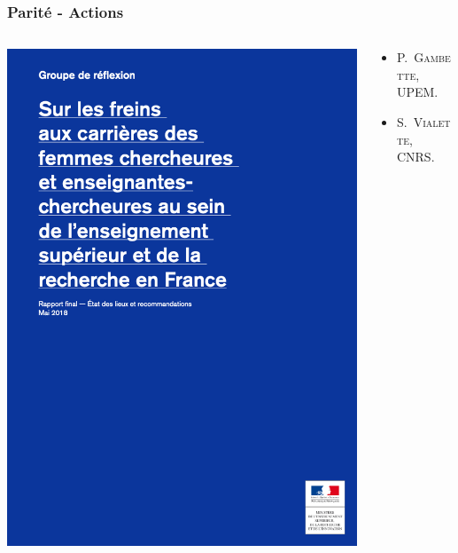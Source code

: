 \documentclass[]{beamer}
\begin{document}

\begin{frame}
  \frametitle{Parité - Actions}

  \begin{center}
    \begin{columns}
      \begin{column}{0.5\textwidth}
        \includegraphics[scale=.375]{pictures/MESRI}
      \end{column}
      \begin{column}{0.5\textwidth}
        \begin{itemize}
          \item \textsc{P.~Gambette}, UPEM.
          \item \textsc{S.~Vialette}, CNRS.
        \end{itemize}
      \end{column}
    \end{columns}
  \end{center}

\end{frame}
\end{document}
